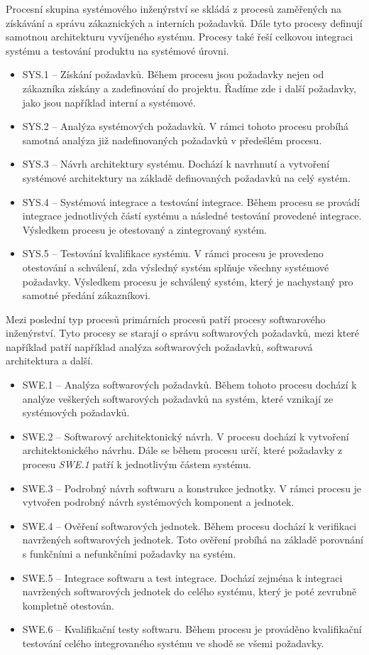\documentclass[czech,master,public,dept460,male,cpdeclaration,oneside]{diploma}
\begin{document}
Procesní skupina systémového inženýrství se skládá z procesů zaměřených na získávání a správu zákaznických a interních požadavků. Dále tyto procesy definují samotnou architekturu vyvíjeného systému. Procesy také řeší celkovou integraci systému a testování produktu na systémové úrovni.

\begin{itemize}
	\item SYS.1 -- Získání požadavků. Během procesu jsou požadavky nejen od zákazníka získány a zadefinování do projektu. Řadíme zde i další požadavky, jako jsou například interní a systémové. 
	\item SYS.2 -- Analýza systémových požadavků. V rámci tohoto procesu probíhá samotná analýza již nadefinovaných požadavků v předešlém procesu.
	\item SYS.3 -- Návrh architektury systému. Dochází k navrhnutí a vytvoření systémové architektury na základě definovaných požadavků na celý systém.
	\item SYS.4 -- Systémová integrace a testování integrace. Během procesu se provádí integrace jednotlivých částí systému a následné testování provedené integrace. Výsledkem procesu je otestovaný a zintegrovaný systém.
	\item SYS.5 -- Testování kvalifikace systému. V rámci procesu je provedeno otestování a schválení, zda výsledný systém splňuje všechny systémové požadavky. Výsledkem procesu je schválený systém, který je nachystaný pro samotné předání zákazníkovi.
\end{itemize}

Mezi poslední typ procesů primárních procesů patří procesy softwarového inženýrství. Tyto procesy se starají o správu softwarových požadavků, mezi které například patří například analýza softwarových požadavků, softwarová architektura a další.

\begin{itemize}
	\item SWE.1 -- Analýza softwarových požadavků. Během tohoto procesu dochází k analýze veškerých softwarových požadavků na systém, které vznikají ze systémových požadavků.
	\item SWE.2 -- Softwarový architektonický návrh. V procesu dochází k vytvoření architektonického návrhu. Dále se během procesu určí, které požadavky z procesu \textit{SWE.1} patří k jednotlivým částem systému. 
	\item SWE.3 -- Podrobný návrh softwaru a konstrukce jednotky. V rámci procesu je vytvořen podrobný návrh systémových komponent a jednotek.
	\item SWE.4 -- Ověření softwarových jednotek. Během procesu dochází k verifikaci navržených softwarových jednotek. Toto ověření probíhá na základě porovnání s funkčními a nefunkčními požadavky na systém.
	\item SWE.5 -- Integrace softwaru a test integrace. Dochází zejména k integraci navržených softwarových jednotek do celého systému, který je poté zevrubně kompletně otestován. 
	\item SWE.6 -- Kvalifikační testy softwaru. Během procesu je prováděno kvalifikační testování celého integrovaného systému ve shodě se všemi požadavky.
\end{itemize}
\end{document}
